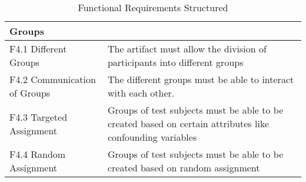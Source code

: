 \begin{table}[htbp]
\begin{tabular}{L{0.35\textwidth}L{0.59\textwidth}}
    Groups                      &             \\ \hline
    F4.1 Different Groups           & The artifact must allow the division of participants into different groups            \\
    F4.2 Communication of Groups    & The different groups must be able to interact with each other.            \\ 
    F4.3 Targeted Assignment        & Groups of test subjects must be able to be created based on certain attributes like confounding variables \\
    F4.4 Random Assignment          & Groups of test subjects must be able to be created based on random assignment \\ \hline
    \end{tabular}
    \caption[Functional Requirements Structured]{Functional Requirements Structured}\label{tab:FuncRequirementsCat}
    \end{table}


